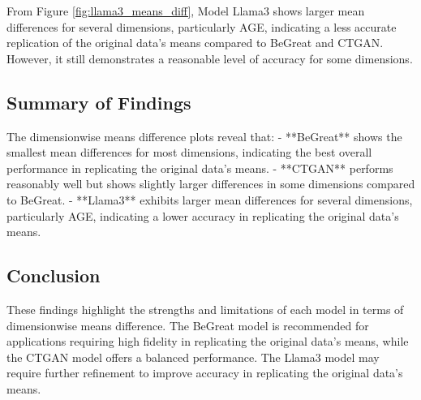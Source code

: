 From Figure \ref{fig:llama3_means_diff}, Model Llama3 shows larger mean differences for several dimensions, particularly AGE, indicating a less accurate replication of the original data's means compared to BeGreat and CTGAN. However, it still demonstrates a reasonable level of accuracy for some dimensions.

\subsection{Summary of Findings}

The dimensionwise means difference plots reveal that:
- **BeGreat** shows the smallest mean differences for most dimensions, indicating the best overall performance in replicating the original data's means.
- **CTGAN** performs reasonably well but shows slightly larger differences in some dimensions compared to BeGreat.
- **Llama3** exhibits larger mean differences for several dimensions, particularly AGE, indicating a lower accuracy in replicating the original data's means.

\subsection{Conclusion}

These findings highlight the strengths and limitations of each model in terms of dimensionwise means difference. The BeGreat model is recommended for applications requiring high fidelity in replicating the original data's means, while the CTGAN model offers a balanced performance. The Llama3 model may require further refinement to improve accuracy in replicating the original data's means.

























